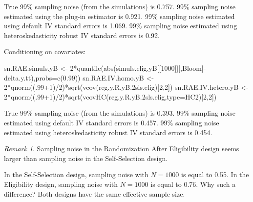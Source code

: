 \documentclass[
]{book}
\newenvironment{Shaded}{\begin{snugshade}}{\end{snugshade}}
\newcommand{\AttributeTok}[1]{\textcolor[rgb]{0.77,0.63,0.00}{#1}}
\newcommand{\DecValTok}[1]{\textcolor[rgb]{0.00,0.00,0.81}{#1}}
\newcommand{\FloatTok}[1]{\textcolor[rgb]{0.00,0.00,0.81}{#1}}
\newcommand{\FunctionTok}[1]{\textcolor[rgb]{0.00,0.00,0.00}{#1}}
\newcommand{\NormalTok}[1]{#1}
\newcommand{\OtherTok}[1]{\textcolor[rgb]{0.56,0.35,0.01}{#1}}
\newcommand{\SpecialCharTok}[1]{\textcolor[rgb]{0.00,0.00,0.00}{#1}}
\newcommand{\StringTok}[1]{\textcolor[rgb]{0.31,0.60,0.02}{#1}}
\theoremstyle{definition}
\theoremstyle{definition}
\theoremstyle{definition}
\theoremstyle{definition}
\theoremstyle{remark}
\newtheorem*{remark}{Remark}
\begin{document}
True 99\% sampling noise (from the simulations) is 0.757.
99\% sampling noise estimated using the plug-in estimator is 0.921.
99\% sampling noise estimated using default IV standard errors is 1.069.
99\% sampling noise estimated using heteroskedasticity robust IV standard errors is 0.92.

Conditioning on covariates:

\begin{Shaded}
\begin{Highlighting}[]
\NormalTok{sn.RAE.simuls.yB }\OtherTok{\textless{}{-}} \DecValTok{2}\SpecialCharTok{*}\FunctionTok{quantile}\NormalTok{(}\FunctionTok{abs}\NormalTok{(simuls.elig.yB[[}\StringTok{\textquotesingle{}1000\textquotesingle{}}\NormalTok{]][,}\StringTok{\textquotesingle{}Bloom\textquotesingle{}}\NormalTok{]}\SpecialCharTok{{-}}\NormalTok{delta.y.tt),}\AttributeTok{probs=}\FunctionTok{c}\NormalTok{(}\FloatTok{0.99}\NormalTok{))}
\NormalTok{sn.RAE.IV.homo.yB }\OtherTok{\textless{}{-}} \DecValTok{2}\SpecialCharTok{*}\FunctionTok{qnorm}\NormalTok{((.}\DecValTok{99}\SpecialCharTok{+}\DecValTok{1}\NormalTok{)}\SpecialCharTok{/}\DecValTok{2}\NormalTok{)}\SpecialCharTok{*}\FunctionTok{sqrt}\NormalTok{(}\FunctionTok{vcov}\NormalTok{(reg.y.R.yB}\FloatTok{.2}\NormalTok{sls.elig)[}\DecValTok{2}\NormalTok{,}\DecValTok{2}\NormalTok{])}
\NormalTok{sn.RAE.IV.hetero.yB }\OtherTok{\textless{}{-}} \DecValTok{2}\SpecialCharTok{*}\FunctionTok{qnorm}\NormalTok{((.}\DecValTok{99}\SpecialCharTok{+}\DecValTok{1}\NormalTok{)}\SpecialCharTok{/}\DecValTok{2}\NormalTok{)}\SpecialCharTok{*}\FunctionTok{sqrt}\NormalTok{(}\FunctionTok{vcovHC}\NormalTok{(reg.y.R.yB}\FloatTok{.2}\NormalTok{sls.elig,}\AttributeTok{type=}\StringTok{\textquotesingle{}HC2\textquotesingle{}}\NormalTok{)[}\DecValTok{2}\NormalTok{,}\DecValTok{2}\NormalTok{])}
\end{Highlighting}
\end{Shaded}

True 99\% sampling noise (from the simulations) is 0.393.
99\% sampling noise estimated using default IV standard errors is 0.457.
99\% sampling noise estimated using heteroskedasticity robust IV standard errors is 0.454.

\begin{remark}
\iffalse{} {Remark. } \fi{}Sampling noise in the Randomization After Eligibility design seems larger than sampling noise in the Self-Selection design.
\end{remark}
In the Self-Selection design, sampling noise with \(N=1000\) is equal to 0.55.
In the Eligibility design, sampling noise with \(N=1000\) is equal to 0.76.
Why such a difference?
Both designs have the same effective sample size.
\end{document}
